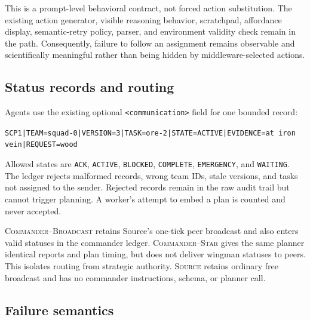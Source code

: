 \documentclass[11pt]{article}
\newcommand{\sourcearm}{\textsc{Source}}
\newcommand{\broadcastarm}{\textsc{Commander--Broadcast}}
\newcommand{\stararm}{\textsc{Commander--Star}}
\newcommand{\code}[1]{\texttt{#1}}
\begin{document}
This is a prompt-level behavioral contract, not forced action substitution.  The
existing action generator, visible reasoning behavior, scratchpad, affordance
display, semantic-retry policy, parser, and environment validity check remain in
the path.  Consequently, failure to follow an assignment remains observable and
scientifically meaningful rather than being hidden by middleware-selected actions.

\subsection{Status records and routing}

Agents use the existing optional \code{<communication>} field for one bounded
record:
\begin{center}
\small\code{SCP1|TEAM=squad-0|VERSION=3|TASK=ore-2|STATE=ACTIVE|EVIDENCE=at iron vein|REQUEST=wood}
\end{center}
Allowed states are \code{ACK}, \code{ACTIVE}, \code{BLOCKED}, \code{COMPLETE},
\code{EMERGENCY}, and \code{WAITING}.  The ledger rejects malformed records,
wrong team IDs, stale versions, and tasks not assigned to the sender.  Rejected
records remain in the raw audit trail but cannot trigger planning.  A worker's
attempt to embed a plan is counted and never accepted.

\broadcastarm{} retains Source's one-tick peer broadcast and also enters valid
statuses in the commander ledger.  \stararm{} gives the same planner identical
reports and plan timing, but does not deliver wingman statuses to peers.  This
isolates routing from strategic authority.  \sourcearm{} retains ordinary free
broadcast and has no commander instructions, schema, or planner call.

\subsection{Failure semantics}
\end{document}
